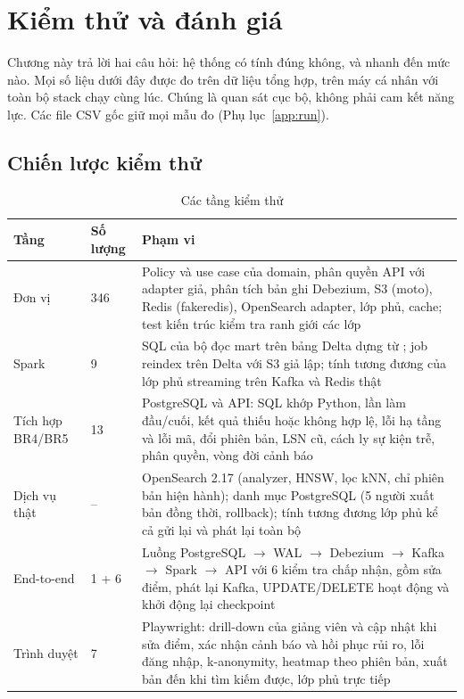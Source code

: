 \chapter{Kiểm thử và đánh giá}
\label{chap:eval}

Chương này trả lời hai câu hỏi: hệ thống có tính đúng không, và nhanh đến mức nào. Mọi số liệu dưới đây được đo trên dữ liệu tổng hợp, trên máy cá nhân với toàn bộ stack chạy cùng lúc. Chúng là quan sát cục bộ, không phải cam kết năng lực. Các file CSV gốc giữ mọi mẫu đo (Phụ lục~\ref{app:run}).

\section{Chiến lược kiểm thử}

\begin{table}[H]
\centering\small
\caption{Các tầng kiểm thử}\label{tab:tests}
\begin{tabularx}{\textwidth}{@{}L{3.3cm}L{1.6cm}Y@{}}
\toprule
\textbf{Tầng} & \textbf{Số lượng} & \textbf{Phạm vi} \\
\midrule
Đơn vị & 346 & Policy và use case của domain, phân quyền API với adapter giả, phân tích bản ghi Debezium, S3 (moto), Redis (fakeredis), OpenSearch adapter, lớp phủ, cache; test kiến trúc kiểm tra ranh giới các lớp \\
Spark & 9 & SQL của bộ đọc mart trên bảng Delta dựng từ ; job reindex trên Delta với S3 giả lập; tính tương đương của lớp phủ streaming trên Kafka và Redis thật \\
Tích hợp BR4/BR5 & 13 & PostgreSQL và API: SQL khớp Python, lần làm đầu/cuối, kết quả thiếu hoặc không hợp lệ, lỗi hạ tầng và lỗi mã, đổi phiên bản, LSN cũ, cách ly sự kiện trễ, phân quyền, vòng đời cảnh báo \\
Dịch vụ thật & -- & OpenSearch 2.17 (analyzer, HNSW, lọc kNN, chỉ phiên bản hiện hành); danh mục PostgreSQL (5 người xuất bản đồng thời, rollback); tính tương đương lớp phủ kể cả gửi lại và phát lại toàn bộ \\
End-to-end & 1 + 6 & Luồng PostgreSQL $\rightarrow$ WAL $\rightarrow$ Debezium $\rightarrow$ Kafka $\rightarrow$ Spark $\rightarrow$ API với 6 kiểm tra chấp nhận, gồm sửa điểm, phát lại Kafka, UPDATE/DELETE hoạt động và khởi động lại checkpoint \\
Trình duyệt & 7 & Playwright: drill-down của giảng viên và cập nhật khi sửa điểm, xác nhận cảnh báo và hồi phục rủi ro, lỗi đăng nhập, k-anonymity, heatmap theo phiên bản, xuất bản đến khi tìm kiếm được, lớp phủ trực tiếp \\
\bottomrule
\end{tabularx}
\end{table}

